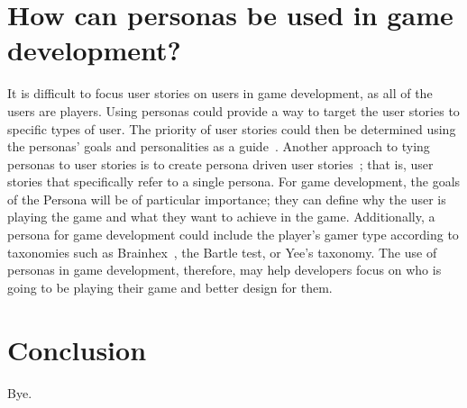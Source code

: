 \documentclass{scrartcl}
\begin{document}

\section{How can personas be used in game development?}
It is difficult to focus user stories on users in game development, as all of the users are players. Using personas could provide a way to target the user stories to specific types of user. The priority of user stories could then be determined using the personas' goals and personalities as a guide~\cite{microsoft thing}. Another approach to tying personas to user stories is to create persona driven user stories~\cite{winter:vision}; that is, user stories that specifically refer to a single persona. For game development, the goals of the Persona will be of particular importance; they can define why the user is playing the game and what they want to achieve in the game. Additionally, a persona for game development could include the player's gamer type according to taxonomies such as Brainhex~\cite{}, the Bartle test\cite{}, or Yee's taxonomy\cite{}. The use of personas in game development, therefore, may help developers focus on who is going to be playing their game and better design for them.

\section{Conclusion}
Bye.



\end{document}
